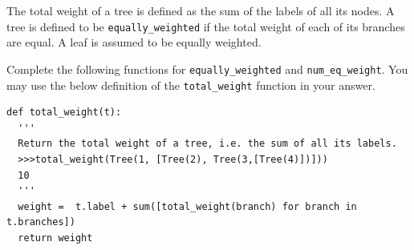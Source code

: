 \question 
The total weight of a tree is defined as the sum of the labels of all its nodes. A tree is defined to be \lstinline{equally_weighted} if the total weight of each of its branches are equal. A leaf is assumed to be equally weighted.

Complete the following functions for \lstinline{equally_weighted} and \lstinline{num_eq_weight}. You may use the below definition of the \lstinline{total_weight} function in your answer.

\begin{lstlisting}
def total_weight(t):
  '''
  Return the total weight of a tree, i.e. the sum of all its labels.
  >>>total_weight(Tree(1, [Tree(2), Tree(3,[Tree(4)])]))
  10
  '''
  weight =  t.label + sum([total_weight(branch) for branch in t.branches])
  return weight
\end{lstlisting}
\vspace{1\baselineskip}
